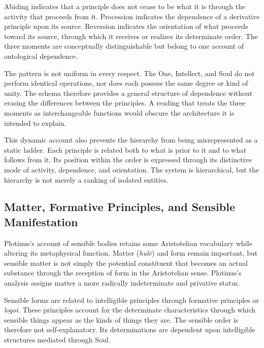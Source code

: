 \label{para:VS.B01.P01.C08.S06.SS05.P002}
Abiding indicates that a principle does not cease to be what it is
through the activity that proceeds from it. Procession indicates
the dependence of a derivative principle upon its source. Reversion
indicates the orientation of what proceeds toward its source, through
which it receives or realizes its determinate order. The three
moments are conceptually distinguishable but belong to one account
of ontological dependence.

\label{para:VS.B01.P01.C08.S06.SS05.P003}
The pattern is not uniform in every respect. The One, Intellect,
and Soul do not perform identical operations, nor does each possess
the same degree or kind of unity. The schema therefore provides a
general structure of dependence without erasing the differences
between the principles. A reading that treats the three moments as
interchangeable functions would obscure the architecture it is
intended to explain.

\label{para:VS.B01.P01.C08.S06.SS05.P004}
This dynamic account also prevents the hierarchy from being
misrepresented as a static ladder. Each principle is related both
to what is prior to it and to what follows from it. Its position
within the order is expressed through its distinctive mode of
activity, dependence, and orientation. The system is hierarchical,
but the hierarchy is not merely a ranking of isolated entities.



\subsection{Matter, Formative Principles, and Sensible Manifestation}
\label{subsec:ch08-plotinus-matter-form}

\label{para:VS.B01.P01.C08.S06.SS06.P001}
Plotinus's account of sensible bodies retains some Aristotelian
vocabulary while altering its metaphysical function. Matter
(\textit{hulē}) and form remain important, but sensible matter is
not simply the potential constituent that becomes an actual
substance through the reception of form in the Aristotelian sense.
Plotinus's analysis assigns matter a more radically indeterminate
and privative status.

\label{para:VS.B01.P01.C08.S06.SS06.P002}
Sensible forms are related to intelligible principles through
formative principles or \textit{logoi}. These principles account
for the determinate characteristics through which sensible things
appear as the kinds of things they are. The sensible order is
therefore not self-explanatory. Its determinations are dependent
upon intelligible structures mediated through Soul.

